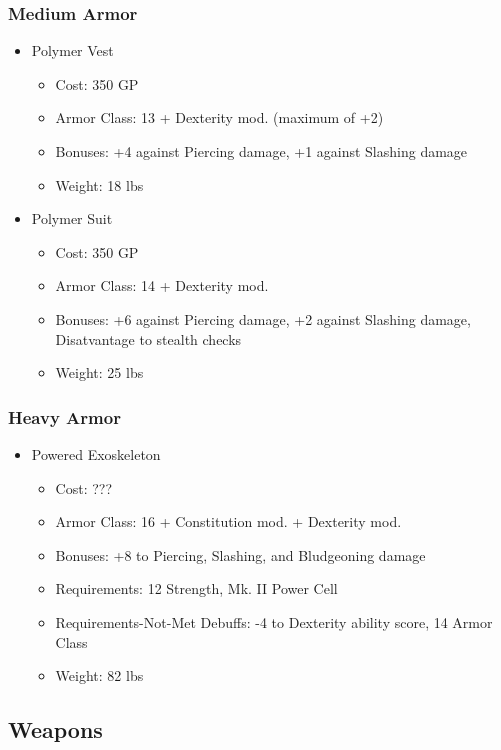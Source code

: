 \documentclass[12pt, landscape]{article}
\begin{document}
\begin{FlushLeft}
\begin{multicols}{2}
			\subsubsection{Medium Armor}
			\begin{itemize}
				\item Polymer Vest
				\begin{itemize}
					\item Cost: 350 GP
					\item Armor Class: 13 + Dexterity mod. (maximum of +2)
					\item Bonuses: +4 against Piercing damage, +1 against Slashing damage
					\item Weight: 18 lbs
				\end{itemize}
				\item Polymer Suit
				\begin{itemize}
					\item Cost: 350 GP
					\item Armor Class: 14 + Dexterity mod.
					\item Bonuses: +6 against Piercing damage, +2 against Slashing damage, Disatvantage to stealth checks
					\item Weight: 25 lbs
				\end{itemize}
			\end{itemize}
			\vfill

			\subsubsection{Heavy Armor}
			\begin{itemize}
				\item Powered Exoskeleton
				\begin{itemize}
					\item Cost: ???
					\item Armor Class: 16 + Constitution mod. + Dexterity mod.
					\item Bonuses: +8 to Piercing, Slashing, and Bludgeoning damage
					\item Requirements: 12 Strength, Mk. II Power Cell
					\item Requirements-Not-Met Debuffs: -4 to Dexterity ability score, 14 Armor Class
					\item Weight: 82 lbs
				\end{itemize}
			\end{itemize}
			\vfill \pagebreak

			\subsection{Weapons}


\end{multicols}
\end{FlushLeft}
\end{document}

